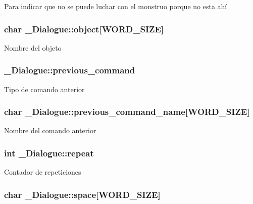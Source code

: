 Para indicar que no se puede luchar con el monstruo porque no esta ahí \hypertarget{struct__Dialogue_a423dddb02d061194426cdde84f1ccf95}{
\subsubsection[{object}]{\setlength{\rightskip}{0pt plus 5cm}char \+\_\+\+Dialogue\+::object\mbox{[}{\bf W\+O\+R\+D\+\_\+\+S\+I\+Z\+E}\mbox{]}}}\label{struct__Dialogue_a423dddb02d061194426cdde84f1ccf95}
Nombre del objeto \hypertarget{struct__Dialogue_a5916cc0658d2489b07e4c07d1af9029f}{
\subsubsection[{previous\+\_\+command}]{ \+\_\+\+Dialogue\+::previous\+\_\+command}}\label{struct__Dialogue_a5916cc0658d2489b07e4c07d1af9029f}
Tipo de comando anterior \hypertarget{struct__Dialogue_a469e24b5ab5ee38a4219889a45c607a0}{
\subsubsection[{previous\+\_\+command\+\_\+name}]{\setlength{\rightskip}{0pt plus 5cm}char \+\_\+\+Dialogue\+::previous\+\_\+command\+\_\+name\mbox{[}{\bf W\+O\+R\+D\+\_\+\+S\+I\+Z\+E}\mbox{]}}}\label{struct__Dialogue_a469e24b5ab5ee38a4219889a45c607a0}
Nombre del comando anterior \hypertarget{struct__Dialogue_a36b7548a4853c80dd35fe7feb6e21252}{
\subsubsection[{repeat}]{\setlength{\rightskip}{0pt plus 5cm}int \+\_\+\+Dialogue\+::repeat}}\label{struct__Dialogue_a36b7548a4853c80dd35fe7feb6e21252}
Contador de repeticiones \hypertarget{struct__Dialogue_a28fdc6bd5c84508d271bf9464245f731}{
\subsubsection[{space}]{\setlength{\rightskip}{0pt plus 5cm}char \+\_\+\+Dialogue\+::space\mbox{[}{\bf W\+O\+R\+D\+\_\+\+S\+I\+Z\+E}\mbox{]}}}\label{struct__Dialogue_a28fdc6bd5c84508d271bf9464245f731}
